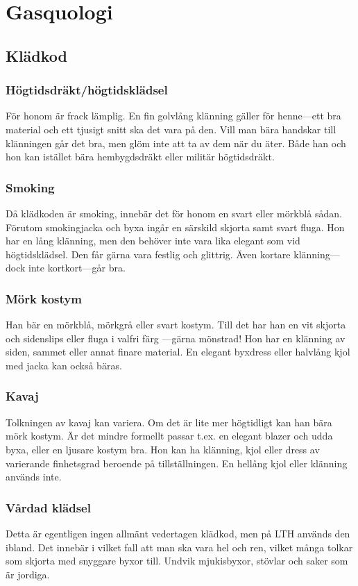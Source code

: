 \thispagestyle{empty}

\section{Gasquologi}
\subsection{Klädkod}
\subsubsection{Högtidsdräkt/högtidsklädsel}
För honom är frack lämplig. En fin golvlång klänning
gäller för henne---ett bra material och ett tjusigt snitt ska
det vara på den. Vill man bära handskar till klänningen
går det bra, men glöm inte att ta av dem när du äter.
Både han och hon kan istället bära hembygdsdräkt eller
militär högtidsdräkt.

\subsubsection{Smoking}
Då klädkoden är smoking, innebär det för honom en svart
eller mörkblå sådan. Förutom smokingjacka och byxa
ingår en särskild skjorta samt svart fluga. Hon har en lång
klänning, men den behöver inte vara lika elegant som vid
högtidsklädsel. Den får gärna vara festlig och glittrig.
Även kortare klänning---dock inte kortkort---går bra.

\subsubsection{Mörk kostym}
Han bär en mörkblå, mörkgrå eller svart kostym. Till det
har han en vit skjorta och sidenslips eller fluga i valfri färg
---gärna mönstrad! Hon har en klänning av siden, sammet
eller annat finare material. En elegant byxdress eller
halvlång kjol med jacka kan också bäras.

\subsubsection{Kavaj}
Tolkningen av kavaj kan variera. Om det är lite mer
högtidligt kan han bära mörk kostym. Är det mindre
formellt passar t.ex. en elegant blazer och udda byxa,
eller en ljusare kostym bra. Hon kan ha klänning, kjol eller
dress av varierande finhetsgrad beroende på
tillställningen. En hellång kjol eller klänning används inte.

\subsubsection{Vårdad klädsel}
Detta är egentligen ingen allmänt vedertagen klädkod,
men på LTH används den ibland. Det innebär i vilket fall
att man ska vara hel och ren, vilket många tolkar som
skjorta med snyggare byxor till. Undvik mjukisbyxor,
stövlar och saker som är jordiga.

